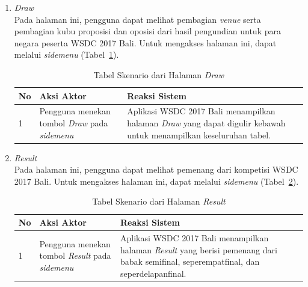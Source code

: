 \begin{enumerate}
	\item {\it Draw} \\ 
	Pada halaman ini, pengguna dapat melihat pembagian {\it venue} serta pembagian kubu proposisi dan oposisi dari hasil pengundian untuk para negara peserta WSDC 2017 Bali. Untuk mengakses halaman ini, dapat melalui \textit{sidemenu} (Tabel~\ref{table:skenarioHalamanDraw}).
		\begin{table}[H]
			\centering
			\caption{Tabel Skenario dari Halaman {\it Draw}}
			\begin{tabular}{|p{0.5cm}|p{7cm}|p{7cm}|}
				\hline
				No & Aksi Aktor                               & Reaksi Sistem                                          \\ \hline
				1  & Pengguna menekan tombol \textit{Draw} pada \textit{sidemenu} & Aplikasi WSDC 2017 Bali menampilkan halaman \textit{Draw} yang dapat digulir kebawah untuk menampilkan keseluruhan tabel. \\ \hline
			\end{tabular}
			\label{table:skenarioHalamanDraw}
		\end{table}

	\item \textit{Result} \\ 
	Pada halaman ini, pengguna dapat melihat pemenang dari kompetisi WSDC 2017 Bali. Untuk mengakses halaman ini, dapat melalui \textit{sidemenu} (Tabel~\ref{table:skenarioHalamanHasil}).
		\begin{table}[H]
			\centering
			\caption{Tabel Skenario dari Halaman \textit{Result}}
			\begin{tabular}{|p{0.5cm}|p{7cm}|p{7cm}|}
				\hline
				No & Aksi Aktor                               & Reaksi Sistem                                          \\ \hline
				1  & Pengguna menekan tombol \textit{Result} pada \textit{sidemenu} & Aplikasi WSDC 2017 Bali menampilkan halaman \textit{Result} yang berisi pemenang dari babak semifinal, seperempatfinal, dan seperdelapanfinal. \\ \hline
			\end{tabular}
			\label{table:skenarioHalamanHasil}
		\end{table}


\end{enumerate}
